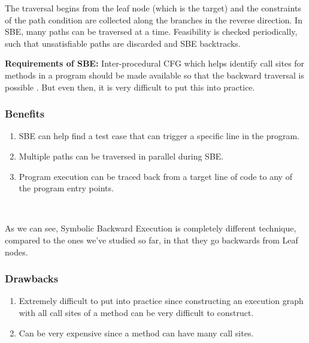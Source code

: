 \documentclass[11pt]{llncs}
\begin{document}
		\vspace{2mm}
		
		The traversal begins from the leaf node (which is the target) and the constraints of the path condition are collected along the branches in the reverse direction. In SBE, many paths can be traversed at a time. Feasibility is checked periodically, such that unsatisfiable paths are discarded and SBE backtracks. \cite{2_Survey_SE}

		\vspace{2mm}

		\textbf{Requirements of SBE:} Inter-procedural CFG which helps identify call sites for methods in a program should be made available so that the backward traversal is possible \cite{2_Survey_SE}. But even then, it is very difficult to put this into practice.


		\subsubsection{Benefits}
			\begin{enumerate}
				\vspace{-0.7mm}
				\item SBE can help find a test case that can trigger a specific line in the program. 
				\item Multiple paths can be traversed in parallel during SBE. \cite{2_Survey_SE}
				\item Program execution can be traced back from a target line of code to any of the program entry points. \cite{16_sbe}
			\end{enumerate}

		~
		\vspace{1mm}

		As we can see, Symbolic Backward Execution is completely different technique, compared to the ones we've studied so far, in that they go backwards from Leaf nodes.
			
			
		\subsubsection{Drawbacks}
			\begin{enumerate}
				\item Extremely difficult to put into practice since constructing an execution graph with all call sites of a method can be very difficult to construct.
				\item Can be very expensive since a method can have many call sites. \cite{2_Survey_SE}

			\end{enumerate}
\end{document}
